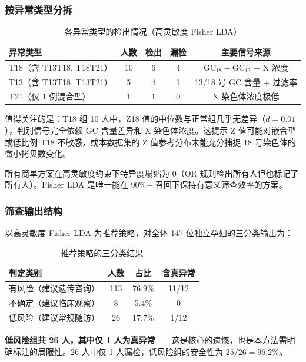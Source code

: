 \documentclass{mcm-paper}
\begin{document}
\subsubsection{按异常类型分拆}

\begin{table}[H]
\centering
\caption{各异常类型的检出情况（高灵敏度 Fisher LDA）}
\label{tab:bytype}
\begin{tabular}{lcccc}
\toprule
异常类型 & 人数 & 检出 & 漏检 & 主要信号来源 \\
\midrule
T18（含 T13T18, T18T21） & 10 & 6 & 4 & GC$_{18}-$GC$_{13}$ + X 浓度 \\
T13（含 T13T18, T13T21） & 5  & 4 & 1 & 13/18 号 GC 含量 + 过滤率 \\
T21（仅 1 例混合型）      & 1  & 1 & 0 & X 染色体浓度极低 \\
\bottomrule
\end{tabular}
\end{table}

值得关注的是：T18 组 10 人中，Z18 值的中位数与正常组几乎无差异（$d=0.01$），判别信号完全依赖 GC 含量差异和 X 染色体浓度。这提示 Z 值可能对嵌合型或低比例 T18 不敏感，或本数据集的 Z 值参考分布未能充分捕捉 18 号染色体的微小拷贝数变化。

所有简单方案在高灵敏度约束下特异度塌缩为 0（OR 规则检出所有人但也标记了所有人）。Fisher LDA 是唯一能在 90\%+ 召回下保持有意义筛查效率的方案。

\subsubsection{筛查输出结构}

以高灵敏度 Fisher LDA 为推荐策略，对全体 147 位独立孕妇的三分类输出为：

\begin{table}[H]
\centering
\caption{推荐策略的三分类结果}
\label{tab:triclass}
\begin{tabular}{lccc}
\toprule
判定类别 & 人数 & 占比 & 含真异常 \\
\midrule
有风险（建议遗传咨询） & 113 & 76.9\% & 11/12 \\
不确定（建议临床观察）    & 8   & 5.4\%  & 0 \\
低风险（建议常规随访）     & 26  & 17.7\% & 1/12 \\
\bottomrule
\end{tabular}
\end{table}

\textbf{低风险组共 26 人，其中仅 1 人为真异常}——这是核心的遗憾，也是本方法需明确标注的局限性。26 人中仅 1 人漏检，低风险组的安全性为 $25/26 = 96.2\%$。
\end{document}

